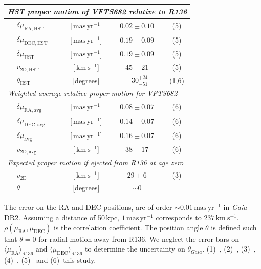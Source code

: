 \documentclass[a4paper,fleqn,usenatbib]{mnras}
\newcommand{\SdM}[1]{{{\color{brown}{#1}}}}
\newcommand{\kms}{{\,\mathrm{km\ s^{-1}}}}
\newcommand{\masyr}{\,\mathrm{mas}\,\mathrm{yr}^{-1}}
\begin{document}
\begin{table}
\begin{center}
\begin{tabular}{llc|c|c}
 \hline     
      \multicolumn{5}{l}{\emph{HST proper motion of VFTS682 relative
      to R136}} \\
            \hline
      &$\delta\mu_\mathrm{RA, HST}$  &[$\masyr$] & $0.02\pm0.10$ & (5) \\
      &$\delta\mu_\mathrm{DEC, HST}$  &[$\masyr$] & $0.19\pm0.09$ &  (5) \\
       &$\delta\mu_\mathrm{HST}$  &[$\masyr$] & $0.19\pm0.09$ &  (5) \\
                  &$v_\mathrm{2D, HST}$  &[$\kms$] & $45\pm21$ & (5)\\  
                      &$\theta_\mathrm{HST}$  &[degrees] &   $-30_{-51}^{+24}$   & (1,6)\\  
      \hline
      \multicolumn{5}{l}{\emph{Weighted average relative proper motion
      for VFTS682}}\\
      \hline
      &$\delta\mu_\mathrm{RA, avg}$  &[$\masyr$] & $0.08\pm0.07$ & (6) \\
      &$\delta\mu_\mathrm{DEC, avg}$  &[$\masyr$] & $0.14\pm0.07$ &  (6) \\
       &$\delta\mu_\mathrm{avg}$  &[$\masyr$] & $0.16\pm0.07$ &  (6) \\
      &$v_\mathrm{2D, avg}$  &[$\kms$] & $38\pm17$ & (6)\\
      \hline
       \multicolumn{5}{l}{\emph{Expected proper motion if ejected from
      R136 at age zero}} \\
      \hline
      &$v_\mathrm{2D}$  &[$\kms$] & $29\pm 6$ & (3) \\  
      &$\theta$  &[degrees] &  $\sim0$  & \\ 
       \hline
    \end{tabular}
    {\tiny The error on the RA and DEC positions, are of order
      $\sim$$0.01\masyr$ in \emph{Gaia}
      DR2. Assuming a distance of 50\,kpc, $1\masyr$ corresponds to $237\kms$.
$\rho(\mu_\mathrm{RA},\mu_\mathrm{DEC})$ is the
      correlation coefficient. The position angle
      $\theta$ is defined such that $\theta=0$ for radial motion
      away from R136. We neglect the error bars on
      $\langle\mu_\mathrm{RA}\rangle_\mathrm{R136}$ and $\langle\mu_\mathrm{DEC}\rangle_\mathrm{R136}$ to determine the uncertainty
      on $\theta_{Gaia}$.
      (1)~\cite{brown:18},
      (2)~\cite{henault-brunet:12},
      (3)~\cite{bestenlehner:11},
      (4)~\cite{lennon:18}, 
      (5)~\cite{platais:18} and
      (6)~{\color{blue}this study}.
    }
  \end{center}
  \label{tab:vfts682}
\end{table}
\end{document}
